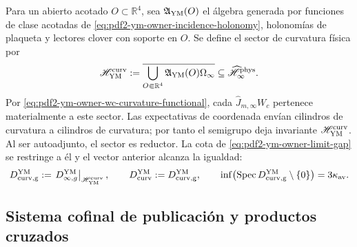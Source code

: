 Para un abierto acotado $O\subset\mathbb R^4$, sea
$\mathfrak A_{\rm YM}(O)$ el álgebra generada por funciones de clase acotadas de
\eqref{eq:pdf2-ym-owner-incidence-holonomy}, holonomías de plaqueta y lectores
clover con soporte en $O$. Se define el sector de curvatura física por
\begin{equation}\label{eq:pdf2-ym-owner-curvature-cyclic-sector}
 \mathscr H_{\rm YM}^{\rm curv}
 :=\overline{\bigcup_{O\Subset\mathbb R^4}
   \mathfrak A_{\rm YM}(O)\Omega_\infty}
 \subseteq\widehat{\mathscr H}_\infty^{\rm phys}.
\end{equation}
Por \eqref{eq:pdf2-ym-owner-wc-curvature-functional}, cada
$\widehat J_{m,\infty}W_c$ pertenece materialmente a este sector.
Las expectativas de coordenada envían cilindros de curvatura a cilindros de
curvatura; por tanto el semigrupo deja invariante
$\mathscr H_{\rm YM}^{\rm curv}$. Al ser autoadjunto, el sector es reductor. La
cota de \eqref{eq:pdf2-ym-owner-limit-gap} se restringe a él y el vector anterior
alcanza la igualdad:
\begin{equation}\label{eq:pdf2-ym-owner-curvature-sector-gap}
 D_{\rm curv,g}^{\rm YM}
 :=\left.D_{\infty,g}^{\rm YM}\right|_{\mathscr H_{\rm YM}^{\rm curv}},
 \qquad D_{\rm curv}^{\rm YM}:=D_{\rm curv,g}^{\rm YM},
 \qquad
 \inf\bigl(\operatorname{Spec}D_{\rm curv,g}^{\rm YM}\setminus\{0\}\bigr)
 =3\kappa_{\rm av}.
\end{equation}

\subsection{Sistema cofinal de publicación y productos cruzados}

